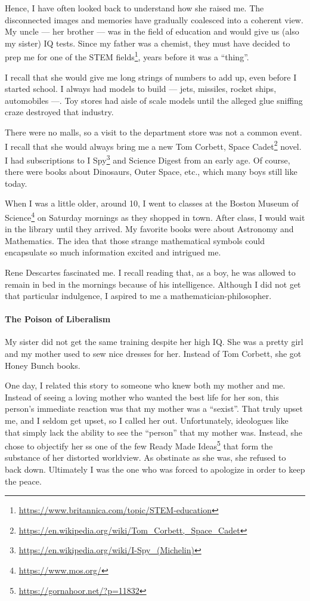 Hence, I have often looked back to understand how she raised me. The disconnected images and memories have gradually coalesced into a coherent view. My uncle --- her brother --- was in the field of education and would give us (also my sister) IQ tests. Since my father was a chemist, they must have decided to prep me for one of the STEM fields\footnote{\url{https://www.britannica.com/topic/STEM-education}}, years before it was a ``thing''.

I recall that she would give me long strings of numbers to add up, even before I started school. I always had models to build --- jets, missiles, rocket ships, automobiles ---. Toy stores had aisle of scale models until the alleged glue sniffing craze destroyed that industry.

There were no malls, so a visit to the department store was not a common event. I recall that she would always bring me a new Tom Corbett, Space Cadet\footnote{\url{https://en.wikipedia.org/wiki/Tom_Corbett,_Space_Cadet}} novel. I had subscriptions to I Spy\footnote{\url{https://en.wikipedia.org/wiki/I-Spy_(Michelin)}} and Science Digest from an early age. Of course, there were books about Dinosaurs, Outer Space, etc., which many boys still like today.

When I was a little older, around 10, I went to classes at the Boston Museum of Science\footnote{\url{https://www.mos.org/}} on Saturday mornings as they shopped in town. After class, I would wait in the library until they arrived. My favorite books were about Astronomy and Mathematics. The idea that those strange mathematical symbols could encapsulate so much information excited and intrigued me.

Rene Descartes fascinated me. I recall reading that, as a boy, he was allowed to remain in bed in the mornings because of his intelligence. Although I did not get that particular indulgence, I aspired to me a mathematician-philosopher.

\paragraph{The Poison of Liberalism}


My sister did not get the same training despite her high IQ. She was a pretty girl and my mother used to sew nice dresses for her. Instead of Tom Corbett, she got Honey Bunch books.

One day, I related this story to someone who knew both my mother and me. Instead of seeing a loving mother who wanted the best life for her son, this person's immediate reaction was that my mother was a ``sexist''. That truly upset me, and I seldom get upset, so I called her out. Unfortunately, ideologues like that simply lack the ability to see the ``person'' that my mother was. Instead, she chose to objectify her ss one of the few Ready Made Ideas\footnote{\url{https://gornahoor.net/?p=11832}} that form the substance of her distorted worldview. As obstinate as she was, she refused to back down. Ultimately I was the one who was forced to apologize in order to keep the peace.



